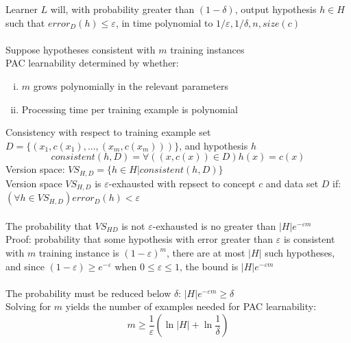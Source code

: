\documentclass{article}
\begin{document}
			Learner $L$ will, with probability greater than $(1 - \delta)$, output hypothesis $h \in H$ such that $error_D(h) \leq \varepsilon$, in time polynomial to $1/\varepsilon, 1/\delta, n, size(c)$ \\
			\\
			Suppose hypotheses consistent with $m$ training instances \\
			PAC learnability determined by whether:
			\begin{enumerate}[(i)]
				\item $m$ grows polynomially in the relevant parameters
				\item Processing time per training example is polynomial
				\end{enumerate}
			Consistency with respect to training example set $D = \{(x_1, c(x_1), ..., (x_m, c(x_m)))\}$, and hypothesis $h$
			\begin{equation*}
				consistent(h, D) = \forall((x, c(x)) \in D) h(x) = c(x)
				\end{equation*}
			Version space: $VS_{H, D} = \{h \in H | consistent(h, D)\}$ \\
			Version space $VS_{H, D}$ is $\varepsilon$-exhausted with repsect to concept $c$ and data set $D$ if: \\
			$(\forall h \in VS_{H, D}) error_D(h) < \varepsilon$ \\
			\\
			The probability that $VS_{HD}$ is not $\varepsilon$-exhausted is no greater than $|H|e^{-\varepsilon m}$ \\
			Proof: probability that some hypothesis with error greater than $\varepsilon$ is consistent with $m$ training instance is $(1 - \varepsilon)^m$, there are at most $|H|$ such hypotheses, and since $(1 - \varepsilon) \geq e^{-\varepsilon}$ when $0 \leq \varepsilon \leq 1$, the bound is $|H|e^{-\varepsilon m}$ \\
			\\
			The probability must be reduced below $\delta$: $|H|e^{-\varepsilon m} \geq \delta$ \\
			Solving for $m$ yields the number of examples needed for PAC learnability:
			\begin{equation*}
				m \geq \frac{1}{\varepsilon}\left(\ln{|H|} + \ln{\frac{1}{\delta}}\right)
				\end{equation*}
\end{document}
